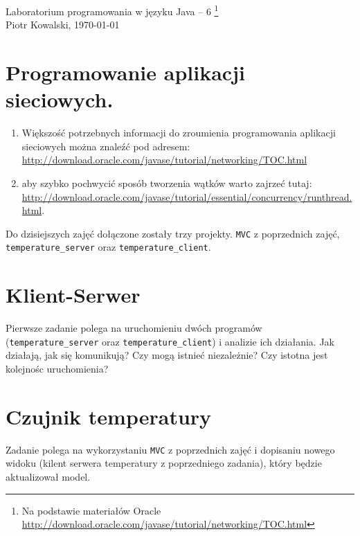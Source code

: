 \documentclass[12pt,letterpaper]{article}
\begin{document}
\linespread{1} %
\small \normalsize %
\begin{flushright}
  Laboratorium programowania w języku Java -- 6
  \footnote{Na podstawie materiałów Oracle 
    \url{http://download.oracle.com/javase/tutorial/networking/TOC.html} }
  \\
  Piotr Kowalski,
  \today
\end{flushright}

\section{Programowanie aplikacji sieciowych.}
\label{sec:programowanie-aplikacji-sieciowych}


\begin{enumerate}
\item Większość potrzebnych informacji do zroumienia programowania
  aplikacji sieciowych można znaleźć pod adresem:
  \url{http://download.oracle.com/javase/tutorial/networking/TOC.html}
\item aby szybko pochwycić sposób tworzenia wątków warto zajrzeć tutaj:
  \url{http://download.oracle.com/javase/tutorial/essential/concurrency/runthread.html}.
\end{enumerate}
Do dzisiejszych zajęć dołączone zostały trzy projekty. \verb+MVC+ z
poprzednich zajęć, \verb+temperature_server+ oraz \verb+temperature_client+.

\section{Klient-Serwer}
\label{sec:klient-serwer}

Pierwsze zadanie polega na uruchomieniu dwóch programów
(\verb+temperature_server+ oraz \verb+temperature_client+) i analizie ich
działania. Jak działają, jak się komunikują? Czy mogą istnieć
niezależnie? Czy istotna jest kolejnośc uruchomienia?

\section{Czujnik temperatury}
\label{sec:czujnik-temperatury}

Zadanie polega na wykorzystaniu \verb+MVC+ z poprzednich zajęć i
dopisaniu nowego widoku (kilent serwera temperatury z poprzedniego zadania), który będzie aktualizował model.
\end{document}
